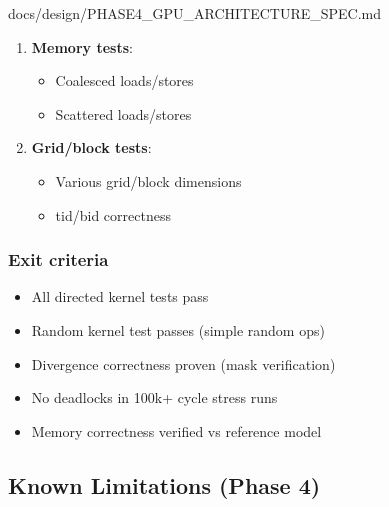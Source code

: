 \begin{relocated}{docs/design/PHASE4_GPU_ARCHITECTURE_SPEC.md}
\begin{enumerate}
  \begin{itemize}
  \tightlist
  \item
    Single if/else with different paths
  \item
    Verify mask handling
  \end{itemize}
\item
  \textbf{Memory tests}:

  \begin{itemize}
  \tightlist
  \item
    Coalesced loads/\allowbreak{}stores
  \item
    Scattered loads/\allowbreak{}stores
  \end{itemize}
\item
  \textbf{Grid/\allowbreak{}block tests}:

  \begin{itemize}
  \tightlist
  \item
    Various grid/\allowbreak{}block dimensions
  \item
    tid/bid correctness
  \end{itemize}
\end{enumerate}

\subsubsection{Exit criteria}\label{ds:ch:phase4-gpu-architecture:exit-criteria}

\begin{itemize}
\tightlist
\item
  All directed kernel tests pass
\item
  Random kernel test passes (simple random ops)
\item
  Divergence correctness proven (mask verification)
\item
  No deadlocks in 100k+ cycle stress runs
\item
  Memory correctness verified vs reference model
\end{itemize}

\subsection{Known Limitations (Phase 4)}\label{ds:ch:phase4-gpu-architecture:known-limitations-phase-4}


\end{relocated}
